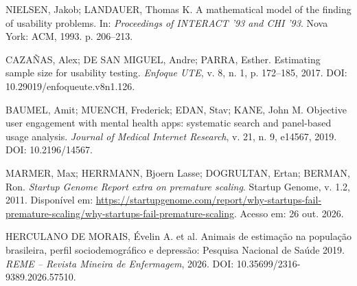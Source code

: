 \documentclass[12pt,a4paper]{article}
\begin{document}
\begin{enumerate}[label={[\arabic*]},leftmargin=1.3cm,itemsep=0.2em,resume]
\item NIELSEN, Jakob; LANDAUER, Thomas K. A mathematical model of the finding of usability problems. In: \textit{Proceedings of INTERACT '93 and CHI '93}. Nova York: ACM, 1993. p. 206--213.
\item CAZAÑAS, Alex; DE SAN MIGUEL, Andre; PARRA, Esther. Estimating sample size for usability testing. \textit{Enfoque UTE}, v. 8, n. 1, p. 172--185, 2017. DOI: 10.29019/enfoqueute.v8n1.126.
\item BAUMEL, Amit; MUENCH, Frederick; EDAN, Stav; KANE, John M. Objective user engagement with mental health apps: systematic search and panel-based usage analysis. \textit{Journal of Medical Internet Research}, v. 21, n. 9, e14567, 2019. DOI: 10.2196/14567.
\item MARMER, Max; HERRMANN, Bjoern Lasse; DOGRULTAN, Ertan; BERMAN, Ron. \textit{Startup Genome Report extra on premature scaling}. Startup Genome, v. 1.2, 2011. Disponível em: \url{https://startupgenome.com/report/why-startups-fail-premature-scaling/why-startups-fail-premature-scaling}. Acesso em: 26 out. 2026.
\item HERCULANO DE MORAIS, Évelin A. et al. Animais de estimação na população brasileira, perfil sociodemográfico e depressão: Pesquisa Nacional de Saúde 2019. \textit{REME -- Revista Mineira de Enfermagem}, 2026. DOI: 10.35699/2316-9389.2026.57510.
\end{enumerate}
\end{document}
